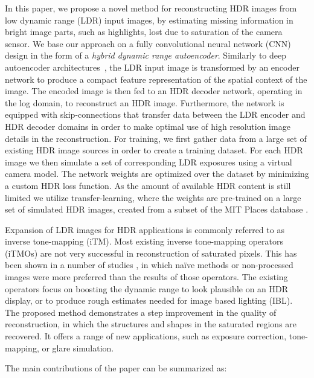 \documentclass[acmtog]{acmart}
\begin{document}
In this paper, we propose a novel method for reconstructing HDR images from low dynamic range (LDR) input images, by estimating missing information in bright image parts, such as highlights, lost due to saturation of the camera sensor. We base our approach on a fully convolutional neural network (CNN) design in the form of a \textit{hybrid dynamic range autoencoder}. Similarly to deep autoencoder architectures~\cite{hinton2006reducing,Vincent2008}, the LDR input image is transformed by an encoder network to produce a compact feature representation of the spatial context of the image. The encoded image is then fed to an HDR decoder network, operating in the log domain, to reconstruct an HDR image. Furthermore, the network is equipped with skip-connections that transfer data between the LDR encoder and HDR decoder domains in order to make optimal use of high resolution image details in the reconstruction. For training, we first gather data from a large set of existing HDR image sources in order to create a training dataset. For each HDR image we then simulate a set of corresponding LDR exposures using a virtual camera model. The network weights are optimized over the dataset by minimizing a custom HDR loss function. 
As the amount of available HDR content is still limited we utilize transfer-learning, where the weights are pre-trained on a large set of simulated HDR images, created from a subset of the MIT Places database \cite{Zhou2014}.

Expansion of LDR images for HDR applications is commonly referred to as inverse tone-mapping (iTM). Most existing inverse tone-mapping operators (iTMOs) are not very successful in reconstruction of saturated pixels. This has been shown in a number of studies \cite{Akyuz2007,Masia2009}, in which na\"ive methods or non-processed images were more preferred than the results of those operators. The existing operators focus on boosting the dynamic range to look plausible on an HDR display, or to produce rough estimates needed for image based lighting (IBL). The proposed method demonstrates a step improvement in the quality of reconstruction, in which the structures and shapes in the saturated regions are recovered. It offers a range of new applications, such as exposure correction, tone-mapping, or glare simulation. 

The main contributions of the paper can be summarized as:
\end{document}
